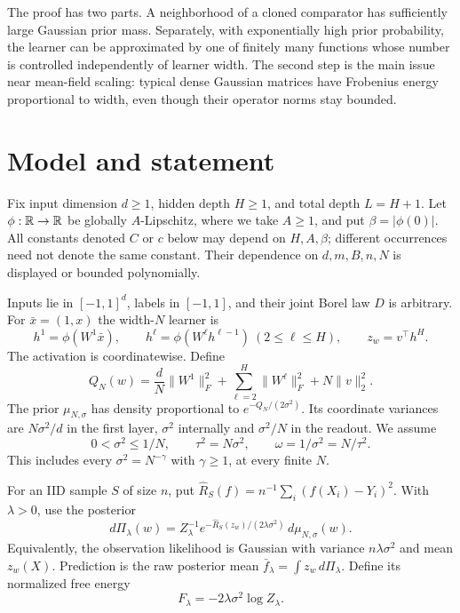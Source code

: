\documentclass[11pt]{article}
\theoremstyle{remark}\newtheorem{remark}[theorem]{Remark}
\newcommand{\whR}{\widehat R}\newcommand{\calF}{\mathcal F}
\begin{document}
The proof has two parts. A neighborhood of a cloned comparator has sufficiently large Gaussian prior mass. Separately, with exponentially high prior probability, the learner can be approximated by one of finitely many functions whose number is controlled independently of learner width. The second step is the main issue near mean-field scaling: typical dense Gaussian matrices have Frobenius energy proportional to width, even though their operator norms stay bounded.

\section{Model and statement}
Fix input dimension $d\ge1$, hidden depth $H\ge1$, and total depth $L=H+1$. Let $\phi:\mathbb R\to\mathbb R$ be globally $A$-Lipschitz, where we take $A\ge1$, and put $\beta=|\phi(0)|$. All constants denoted $C$ or $c$ below may depend on $H,A,\beta$; different occurrences need not denote the same constant. Their dependence on $d,m,B,n,N$ is displayed or bounded polynomially.

Inputs lie in $[-1,1]^d$, labels in $[-1,1]$, and their joint Borel law $D$ is arbitrary. For $\bar x=(1,x)$ the width-$N$ learner is
\[
 h^1=\phi(W^1\bar x),\qquad
 h^\ell=\phi(W^\ell h^{\ell-1})\ (2\le\ell\le H),\qquad
 z_w=v^\top h^H.
\]
The activation is coordinatewise. Define
\[
 Q_N(w)=\frac dN\|W^1\|_F^2+\sum_{\ell=2}^H\|W^\ell\|_F^2
                  +N\|v\|_2^2.
\]
The prior $\mu_{N,\sigma}$ has density proportional to
$e^{-Q_N/(2\sigma^2)}$. Its coordinate variances are $N\sigma^2/d$ in the first layer, $\sigma^2$ internally and $\sigma^2/N$ in the readout. We assume
\begin{equation}
 0<\sigma^2\le1/N,\qquad \tau^2=N\sigma^2,\qquad \omega=1/\sigma^2=N/\tau^2.
 \label{eq:scales}
\end{equation}
This includes every $\sigma^2=N^{-\gamma}$ with $\gamma\ge1$, at every finite $N$.

For an IID sample $S$ of size $n$, put $\whR_S(f)=n^{-1}\sum_i(f(X_i)-Y_i)^2$. With $\lambda>0$, use the posterior
\begin{equation}
 d\Pi_\lambda(w)=Z_\lambda^{-1}
 e^{-\whR_S(z_w)/(2\lambda\sigma^2)}\,d\mu_{N,\sigma}(w).
 \label{eq:posterior}
\end{equation}
Equivalently, the observation likelihood is Gaussian with variance $n\lambda\sigma^2$ and mean $z_w(X)$. Prediction is the raw posterior mean $\bar f_\lambda=\int z_w\,d\Pi_\lambda$. Define its normalized free energy
\begin{equation}
 F_\lambda=-2\lambda\sigma^2\log Z_\lambda.
 \label{eq:freeenergy}
\end{equation}
\end{document}
